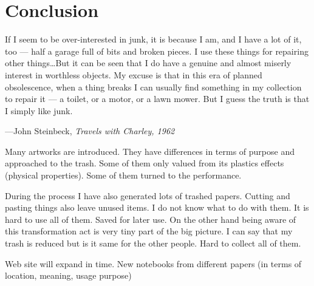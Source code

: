 \chapter{Conclusion}





%
%
\epigraph{If I seem to be over-interested in junk, it is because I am, and I have a lot of it, too --- half a garage full of bits and broken pieces. I use these things for repairing other things\ldots But it can be seen that I do have a genuine and almost miserly interest in worthless objects. My excuse is that in this era of planned obsolescence, when a thing breaks I can usually find something in my collection to repair it --- a toilet, or a motor, or a lawn mower. But I guess the truth is that I simply like junk.}{\hfill---John Steinbeck, \textit{Travels with Charley, 1962}}





%
%
Many artworks are introduced. They have differences in terms of purpose and approached to the trash. Some of them only valued from its plastics effects (physical properties). Some of them turned to the performance. 







%
%
 During the process I have also generated lots of trashed papers. Cutting and pasting things also leave unused items. I do not know what to do with them. It is hard to use all of them. Saved for later use. On the other hand being aware of this transformation act is very tiny part of the big picture. I can say that my trash is reduced but is it same for the other people. Hard to collect all of them. 







%
%
 Web site will expand in time. New notebooks from different papers (in terms of location, meaning, usage purpose)


